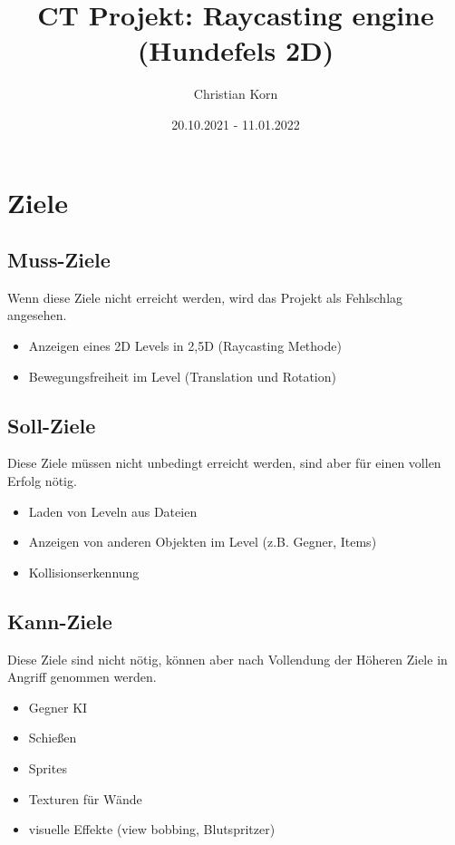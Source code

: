 \documentclass[a4paper,titlepage]{article}
\title{CT Projekt: Raycasting engine (Hundefels 2D)}
\author{Christian Korn}
\date{20.10.2021 - 11.01.2022}
\begin{document}
\maketitle
\tableofcontents

\newpage

\section{Ziele}

\subsection{Muss-Ziele}
Wenn diese Ziele nicht erreicht werden, wird das Projekt als Fehlschlag angesehen.

\begin{itemize}
\item Anzeigen eines 2D Levels in 2,5D (Raycasting Methode)
\item Bewegungsfreiheit im Level (Translation und Rotation)
\end{itemize}

\subsection{Soll-Ziele}
Diese Ziele müssen nicht unbedingt erreicht werden, sind aber für einen vollen Erfolg nötig.

\begin{itemize}
\item Laden von Leveln aus Dateien
\item Anzeigen von anderen Objekten im Level (z.B. Gegner, Items)
\item Kollisionserkennung
\end{itemize}

\subsection{Kann-Ziele}
Diese Ziele sind nicht nötig, können aber nach Vollendung der Höheren Ziele in Angriff genommen werden.

\begin{itemize}
\item Gegner KI
\item Schießen
\item Sprites
\item Texturen für Wände
\item visuelle Effekte (view bobbing, Blutspritzer)
\end{itemize}
\end{document}
